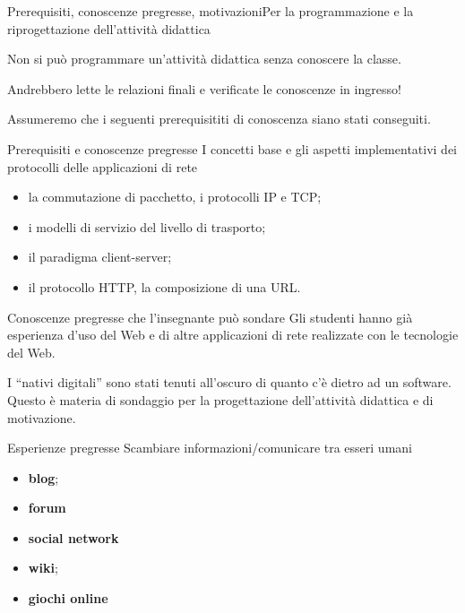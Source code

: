 \documentclass[italian]{beamer}
\begin{document}
\begin{frame}[allowframebreaks]{Prerequisiti, conoscenze pregresse, motivazioni}{Per la programmazione e la riprogettazione dell'attivit\`a didattica}

	Non si pu\`o programmare un'attivit\`a didattica senza conoscere la classe.
	
	Andrebbero lette le relazioni finali e verificate le conoscenze in ingresso!
	
	Assumeremo che i seguenti prerequisititi di conoscenza siano stati conseguiti.
		
	\begin{block}{Prerequisiti e conoscenze pregresse}
		I concetti base e gli aspetti implementativi dei protocolli delle applicazioni di rete
		
		\begin{itemize}
			\item la commutazione di pacchetto, i protocolli IP e TCP;
			\item i modelli di servizio del livello di trasporto;
			\item il paradigma client-server;
			\item il protocollo HTTP, la composizione di una URL.		
		\end{itemize}
	\end{block}
	
	\begin{block}{Conoscenze pregresse che l'insegnante pu\`o sondare}
		Gli studenti hanno gi\`a esperienza d'uso del Web e di altre applicazioni di rete realizzate con le tecnologie del Web.
		
		\medskip
		
		I ``nativi digitali'' sono stati tenuti all'oscuro di quanto c'\`e dietro ad un software. Questo \`e materia di sondaggio per la progettazione dell'attivit\`a didattica e di motivazione.
	\end{block}
	
	
	{\centering
	}


	\begin{block}{Esperienze pregresse}
		Scambiare informazioni/comunicare tra esseri umani
		\begin{itemize}
			\item \textbf{blog};
			\item \textbf{forum}
			\item \textbf{social network}
			\item \textbf{wiki};
			\item \textbf{giochi online}
		\end{itemize}
		

\end{block}
\end{frame}
\end{document}

